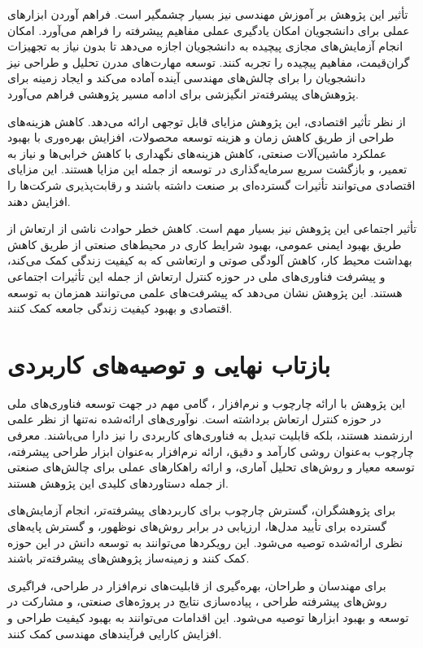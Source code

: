 تأثیر این پژوهش بر آموزش مهندسی نیز بسیار چشمگیر است. فراهم آوردن ابزارهای عملی برای دانشجویان امکان یادگیری عملی مفاهیم پیشرفته را فراهم می‌آورد. امکان انجام آزمایش‌های مجازی پیچیده به دانشجویان اجازه می‌دهد تا بدون نیاز به تجهیزات گران‌قیمت، مفاهیم پیچیده را تجربه کنند. توسعه مهارت‌های مدرن تحلیل و طراحی نیز دانشجویان را برای چالش‌های مهندسی آینده آماده می‌کند و ایجاد زمینه برای پژوهش‌های پیشرفته‌تر انگیزشی برای ادامه مسیر پژوهشی فراهم می‌آورد.

از نظر تأثیر اقتصادی، این پژوهش مزایای قابل توجهی ارائه می‌دهد. کاهش هزینه‌های طراحی از طریق کاهش زمان و هزینه توسعه محصولات، افزایش بهره‌وری با بهبود عملکرد ماشین‌آلات صنعتی، کاهش هزینه‌های نگهداری با کاهش خرابی‌ها و نیاز به تعمیر، و بازگشت سریع سرمایه‌گذاری در توسعه از جمله این مزایا هستند. این مزایای اقتصادی می‌توانند تأثیرات گسترده‌ای بر صنعت داشته باشند و رقابت‌پذیری شرکت‌ها را افزایش دهند.

تأثیر اجتماعی این پژوهش نیز بسیار مهم است. کاهش خطر حوادث ناشی از ارتعاش از طریق بهبود ایمنی عمومی، بهبود شرایط کاری در محیط‌های صنعتی از طریق کاهش بهداشت محیط کار، کاهش آلودگی صوتی و ارتعاشی که به کیفیت زندگی کمک می‌کند، و پیشرفت فناوری‌های ملی در حوزه کنترل ارتعاش از جمله این تأثیرات اجتماعی هستند. این پژوهش نشان می‌دهد که پیشرفت‌های علمی می‌توانند همزمان به توسعه اقتصادی و بهبود کیفیت زندگی جامعه کمک کنند.

\section{بازتاب نهایی و توصیه‌های کاربردی}

این پژوهش با ارائه چارچوب  و نرم‌افزار ، گامی مهم در جهت توسعه فناوری‌های ملی در حوزه کنترل ارتعاش برداشته است. نوآوری‌های ارائه‌شده نه‌تنها از نظر علمی ارزشمند هستند، بلکه قابلیت تبدیل به فناوری‌های کاربردی را نیز دارا می‌باشند. معرفی چارچوب  به‌عنوان روشی کارآمد و دقیق، ارائه نرم‌افزار  به‌عنوان ابزار طراحی پیشرفته، توسعه معیار  و روش‌های تحلیل آماری، و ارائه راهکارهای عملی برای چالش‌های صنعتی از جمله دستاوردهای کلیدی این پژوهش هستند.

برای پژوهشگران، گسترش چارچوب  برای کاربردهای پیشرفته‌تر، انجام آزمایش‌های گسترده برای تأیید مدل‌ها، ارزیابی در برابر روش‌های نوظهور، و گسترش پایه‌های نظری ارائه‌شده توصیه می‌شود. این رویکردها می‌توانند به توسعه دانش در این حوزه کمک کنند و زمینه‌ساز پژوهش‌های پیشرفته‌تر باشند.

برای مهندسان و طراحان، بهره‌گیری از قابلیت‌های نرم‌افزار  در طراحی، فراگیری روش‌های پیشرفته طراحی ، پیاده‌سازی نتایج در پروژه‌های صنعتی، و مشارکت در توسعه و بهبود ابزارها توصیه می‌شود. این اقدامات می‌توانند به بهبود کیفیت طراحی و افزایش کارایی فرآیندهای مهندسی کمک کنند.

